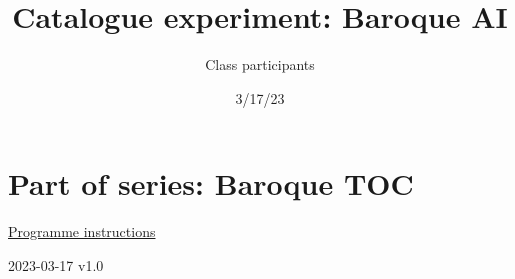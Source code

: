 \documentclass[
  letterpaper,
]{book}
\title{Catalogue experiment: Baroque AI}
\author{Class participants}
\date{3/17/23}
\renewcommand*\contentsname{Table of contents}
\newcommand\contentsname{Table of contents}
\begin{document}
\frontmatter
\maketitle
\ifdefined\Shaded\renewenvironment{Shaded}{\begin{tcolorbox}[boxrule=0pt, sharp corners, breakable, borderline west={3pt}{0pt}{shadecolor}, enhanced, interior hidden, frame hidden]}{\end{tcolorbox}}\fi

\renewcommand*\contentsname{Table of contents}
{
\setcounter{tocdepth}{2}
\tableofcontents
}
\mainmatter
{}

\hypertarget{part-of-series-baroque-toc}{%
\chapter{Part of series: Baroque TOC}\label{part-of-series-baroque-toc}}

\href{https://mrchristian.github.io/Workshop-Publishing-from-Collections/}{Programme
instructions}

2023-03-17 v1.0
\end{document}
